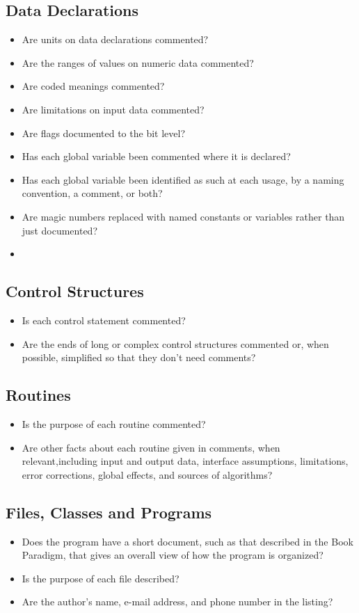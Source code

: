 \subsection{Data Declarations}
\begin{itemize}
\item Are units on data declarations commented?
\item Are the ranges of values on numeric data commented?
\item Are coded meanings commented?
\item Are limitations on input data commented?
\item Are flags documented to the bit level?
\item Has each global variable been commented where it is declared?
\item Has each global variable been identified as such at each usage, by a naming convention, a comment, or both?
\item Are magic numbers replaced with named constants or variables rather than just documented?
\item 
\end{itemize}
\subsection{Control Structures}
\begin{itemize}
\item Is each control statement commented?
\item Are the ends of long or complex control structures commented or, when possible, simplified so that they don’t need comments?
\end{itemize}

\subsection{Routines}
\begin{itemize}
\item Is the purpose of each routine commented?
\item Are other facts about each routine given in comments, when relevant,including input and output data, interface assumptions, limitations, error corrections, global effects, and sources of algorithms?
\end{itemize}

\subsection{Files, Classes and Programs}
\begin{itemize}
\item Does the program have a short document, such as that described in the Book Paradigm, that gives an overall view of how the program is organized?
\item Is the purpose of each file described?
\item Are the author’s name, e-mail address, and phone number in the listing?
\end{itemize}